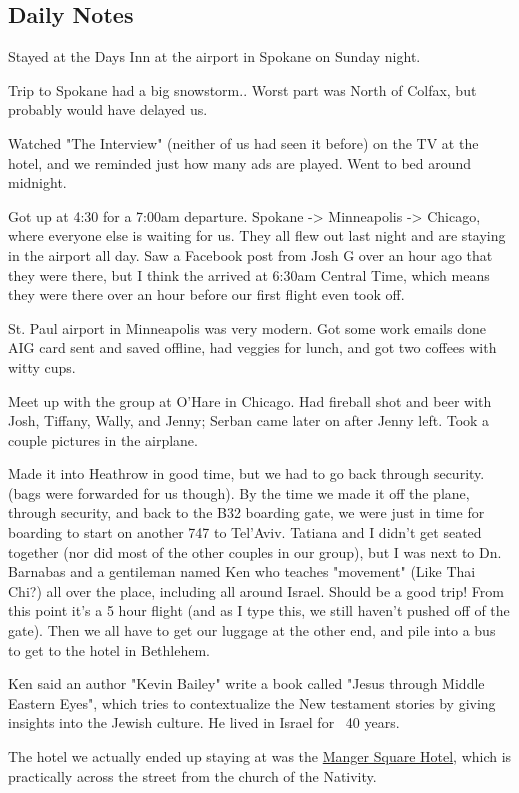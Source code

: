\documentclass[letterpaper]{report}
\begin{document}
\clearpage
\begin{multicols}{2}
\section{Daily Notes}
Stayed at the Days Inn at the airport  in Spokane on Sunday night.

Trip to Spokane had a big snowstorm.. Worst part was North of Colfax, but probably would have delayed us.

Watched "The Interview" (neither of us had seen it before) on the TV at the hotel, and we reminded just how many ads are played. Went to bed around midnight.

Got up at 4:30 for a 7:00am departure. Spokane -> Minneapolis -> Chicago, where everyone else is waiting for us. They all flew out last night and are staying in the airport all day. Saw a Facebook post from Josh G over an hour ago that they were there, but I think the arrived at 6:30am Central Time, which means they were there over an hour before our first flight even took off.

St. Paul airport in Minneapolis was very modern. Got some work emails done AIG card sent and saved offline, had veggies for lunch, and got two coffees with witty cups.

Meet up with the group at O'Hare in Chicago. Had fireball shot and beer with Josh, Tiffany, Wally, and Jenny; Serban came later on after Jenny left. Took a couple pictures in the airplane.

Made it into Heathrow in good time, but we had to go back through security.  (bags were forwarded for us though).
By the time we made it off the plane, through security, and back to the B32 boarding gate, we were just in time for boarding to start on another 747 to Tel'Aviv.  Tatiana and I didn't get seated together (nor did most of the other couples in our group), but I was next to Dn. Barnabas and a gentileman named Ken who teaches "movement" (Like Thai Chi?) all over the place, including all around Israel. Should be a good trip!   From this point it's a 5 hour flight (and as I type this, we still haven't pushed off of the gate).  Then we all have to get our luggage at the other end, and pile into a bus to get to the hotel in Bethlehem.

Ken said an author "Kevin Bailey" write a book called "Jesus through Middle Eastern Eyes", which tries to contextualize the New testament stories by giving insights into the Jewish culture. He lived in Israel for ~40 years.

The hotel we actually ended up staying at was the
\href{http://www.mangersquarehotel.com/}{
  Manger Square Hotel}, which is practically across the street from the church of the Nativity.
\end{multicols}
\end{document}
